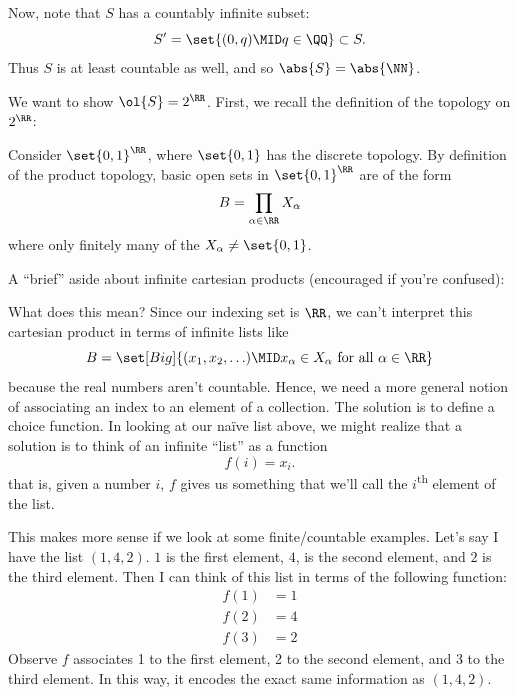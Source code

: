 \documentclass{fkpset}
\begin{document}
\begin{solution}
\begin{leftbar}
      Now, note that $S$ has a countably infinite subset:
      \[
        S' = \set{(0,q) \MID q \in \QQ} \subset S.
      \]
      Thus $S$ is at least countable as well, and so $\abs{S} =
      \abs{\NN}$. \cmark
    \end{leftbar}
    We want to show $\ol{S} = 2^\RR$. First, we recall the definition
    of the topology on $2^\RR$:
    \begin{leftbar}
      Consider $\set{0,1}^\RR$, where $\set{0,1}$ has the discrete
      topology. By definition of the product topology, basic open sets
      in $\set{0,1}^\RR$ are of the form
      \[
        B = \prod_{\alpha \in \RR} X_\alpha
      \]
      where only finitely many of the $X_\alpha \neq \set{0,1}$.
    \end{leftbar}
    A ``brief'' aside about infinite cartesian products (encouraged if
    you're confused):
    \begin{leftbar}
      \begin{note}
        What does this mean?
        {\color{Red}
          Since our indexing set is $\RR$, we can't interpret this
          cartesian product in terms of infinite lists like
          \[
            B = \set[Big]{(x_1, x_2, \ldots) \MID x_\alpha \in
              X_\alpha \text{ for all } \alpha \in \RR}
          \]
          because the real numbers aren't countable. Hence, we need a
          more general notion of associating an index to an element of
          a collection. The solution is to define a choice function.
        }
        {\color{Orange}
          In looking at our na\"{i}ve list above, we might realize
          that a solution is to think of an infinite ``list'' as a
          function
          \[
            f(i) = x_i.
          \]
          that is, given a number $i$, $f$ gives us something that
          we'll call the $i$\textsuperscript{th} element of the list.
        }

        {\color{Green}
          This makes more sense if we look at some finite/countable
          examples. Let's say I have the list $(1,4,2)$. $1$ is the
          first element, $4$, is the second element, and $2$ is the
          third element. Then I can think of this list in terms of the
          following function:
          \begin{align*}
            f(1) &= 1 \\
            f(2) &= 4 \\
            f(3) &= 2
          \end{align*}
          Observe $f$ associates 1 to the first element, 2 to the
          second element, and 3 to the third element. In this way, it
          encodes the exact same information as $(1,4,2)$.

}
\end{note}
\end{leftbar}
\end{solution}
\end{document}
